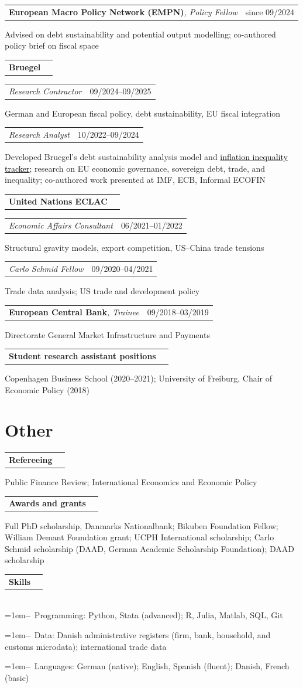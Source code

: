 \documentclass[a4paper,11pt]{article}
\makeatletter
\newlength{\entrygap}      \setlength{\entrygap}{5pt}
\newlength{\rolegap}       \setlength{\rolegap}{3pt}
\newcommand{\cvrow}[2]{%
  \begin{tabular*}{\textwidth}[t]{@{}l@{\extracolsep{\fill}}r@{}}
    #1 & {\footnotesize #2} \\
  \end{tabular*}
}
\newcommand{\cventry}[4]{\cvrow{\textbf{#1}\textit{\small #2}}{#3}
  {\small #4}
  \vspace{\entrygap}}
\newcommand{\cvhead}[1]{%
  \begin{tabular*}{\textwidth}[t]{@{}l@{\extracolsep{\fill}}r@{}}
    \textbf{#1} & \\
  \end{tabular*}%
  \par\nobreak
}
\newcommand{\cvrole}[3]{\cvrow{\textit{\small #1}}{#2}
  {\small #3}}
\newcommand{\cvrolelast}[3]{\vspace{\rolegap}\cvrole{#1}{#2}{#3}\vspace{\entrygap}}
\newcommand{\myitem}[1]{\hangindent=1em\hangafter=1\textbf{--}~#1\par}
\newcommand{\blacklink}[2]{\href{#1}{\textcolor{black}{#2}}}
\makeatother
\begin{document}
\cventry{European Macro Policy Network (EMPN)}{, Policy Fellow}{since 09/2024}
{Advised on debt sustainability and potential output modelling; co-authored policy brief on fiscal space}

\cvhead{Bruegel}

\cvrole{Research Contractor}{09/2024--09/2025}
{German and European fiscal policy, debt sustainability, EU fiscal integration}

\cvrolelast{Research Analyst}{10/2022--09/2024}
{Developed Bruegel's debt sustainability analysis model and \blacklink{https://www.bruegel.org/dataset/inflation-inequality-european-union-and-its-drivers}{inflation inequality tracker}; research on EU economic governance,
sovereign debt, trade, and inequality;
co-authored work presented at IMF, ECB, Informal ECOFIN}

\cvhead{United Nations ECLAC}

\cvrole{Economic Affairs Consultant}{06/2021--01/2022}
{Structural gravity models, export competition, US--China trade tensions}

\cvrolelast{Carlo Schmid Fellow}{09/2020--04/2021}
{Trade data analysis; US trade and development policy}


\cventry{European Central Bank}{, Trainee}{09/2018--03/2019}
{Directorate General Market Infrastructure and Payments}

\cventry{Student research assistant positions}{}{}
{Copenhagen Business School (2020--2021); University of Freiburg, Chair of Economic Policy (2018)}

\section{Other}

\cventry{Refereeing}{}{}
{Public Finance Review; International Economics and Economic Policy}

\cventry{Awards and grants}{}{}
{Full PhD scholarship, Danmarks Nationalbank; Bikuben Foundation Fellow; William Demant Foundation grant;
UCPH International scholarship;
Carlo Schmid scholarship (DAAD, German Academic Scholarship Foundation); DAAD scholarship}

\cventry{Skills}{}{}
{\\
\myitem{Programming: Python, Stata (advanced); R, Julia, Matlab, SQL, Git}
\myitem{Data: Danish administrative registers (firm, bank, household, and customs microdata);
international trade data}
\myitem{Languages: German (native); English, Spanish (fluent); Danish, French (basic)}
}
\end{document}
